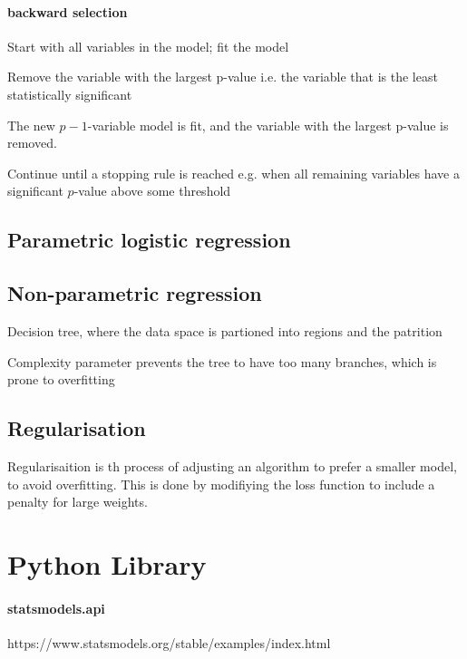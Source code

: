 \documentclass[12pt,a4paper]{article}
\begin{document}
\paragraph{backward selection}

Start with all variables in the model; fit the model

Remove the variable with the largest p-value i.e. the variable that is the least statistically significant

The new $p-1$-variable model is fit, and the variable with the largest p-value is removed.

Continue until a stopping rule is reached e.g. when all remaining variables have a significant $p$-value above some threshold
\subsection{Parametric logistic regression}
\subsection{Non-parametric regression}
Decision tree, where the data space is partioned into regions and the patrition

Complexity parameter prevents the tree to have too many branches, which is prone to overfitting
\subsection{Regularisation}
Regularisaition is th process of adjusting an algorithm to prefer a smaller model, to avoid overfitting. This is done by modifiying the loss function to include a penalty for large weights.

\section{Python Library}
\paragraph{statsmodels.api}
https://www.statsmodels.org/stable/examples/index.html
\end{document}
